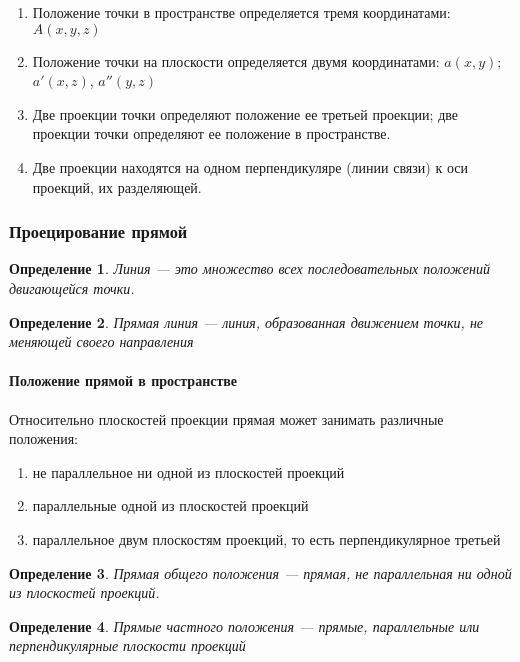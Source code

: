 \documentclass{article}
\newtheorem{definition}{Определение}
\begin{document}
\begin{flushleft}
\begin{enumerate}
    \item Положение точки в пространстве определяется тремя координатами: $A(x, y, z)$
    \item Положение точки на плоскости определяется двумя координатами: $a(x, y);$ $a'(x, z)$, $a''(y, z)$
    \item Две проекции точки определяют положение ее третьей проекции; две проекции точки определяют ее положение в пространстве.
    \item Две проекции находятся на одном перпендикуляре (линии связи) к оси проекций, их разделяющей.
\end{enumerate}

\subsubsection{Проецирование прямой}

\begin{definition}
    Линия — это множество всех последовательных положений двигающейся точки.
\end{definition}

\begin{definition}
    Прямая линия — линия, образованная движением точки, не меняющей своего направления
\end{definition}

\paragraph{Положение прямой в пространстве}

Относительно плоскостей проекции прямая может занимать различные положения:

\begin{enumerate}
    \item не параллельное ни одной из плоскостей проекций
    \item параллельные одной из плоскостей проекций
    \item параллельное двум плоскостям проекций, то есть перпендикулярное третьей
\end{enumerate}

\begin{definition}
    Прямая общего положения — прямая, не параллельная ни одной из плоскостей проекций.
\end{definition}

\begin{definition}
    Прямые частного положения — прямые, параллельные или перпендикулярные плоскости проекций
\end{definition}


\end{flushleft}
\end{document}

